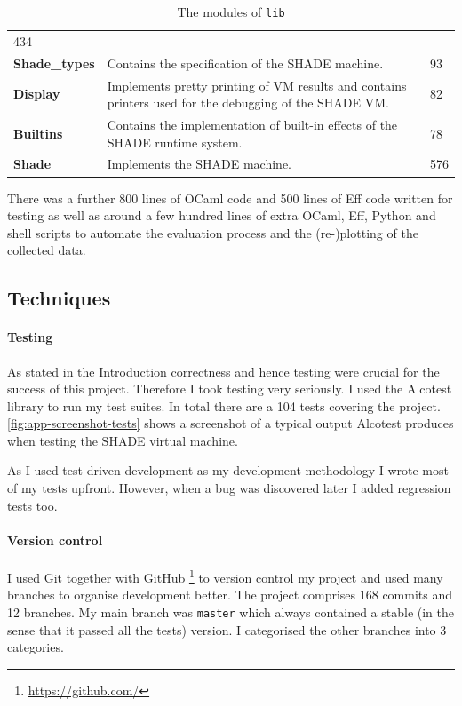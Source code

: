 \documentclass[class=article, crop=false]{standalone}
\begin{document}
\begin{table}[htb]
{\begin{tabular}{lp{10cm}l}
        434 \\
    \textbf{Shade\_types} &
        Contains the specification of the SHADE machine. &
        93 \\
    \textbf{Display} &
        Implements pretty printing of VM results and contains printers used for
        the debugging of the SHADE VM. &
        82 \\
    \textbf{Builtins} &
        Contains the implementation of built-in effects of the SHADE runtime
        system. &
        78 \\
    \textbf{Shade} &
        Implements the SHADE machine. &
        576 \\
    \bottomrule
    \end{tabular}}
    \caption[OCaml modules and their purpose]{The modules of \texttt{lib}}
    \label{tab:lib-modules}
\end{table}

There was a further 800 lines of OCaml code and 500 lines of Eff code written
for testing as well as around a few hundred lines of extra OCaml, Eff, Python
and shell scripts to automate the evaluation process and the (re-)plotting of
the collected data.


\subsection{Techniques}
\paragraph{Testing}

As stated in the Introduction correctness and hence testing were crucial for
the success of this project. Therefore I took testing very seriously. I used the
Alcotest library to run my test suites. In total there are a 104 tests covering
the project. \autoref{fig:app-screenshot-tests} shows a screenshot of a typical output Alcotest
produces when testing the SHADE virtual machine.

As I used test driven development as my development methodology I wrote most of
my tests upfront. However, when a bug was discovered later I added regression
tests too.

\paragraph{Version control}

I used Git together with GitHub%
\footnote{\url{https://github.com/}}
to version control my project and used many branches to organise development
better. The project comprises 168 commits and 12 branches.
My main branch was \verb|master| which always contained a stable (in
the sense that it passed all the tests) version. I categorised the other
branches into 3 categories.
\end{document}
